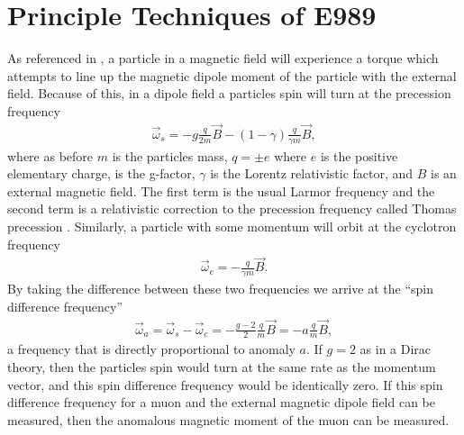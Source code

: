 
\thispagestyle{myheadings}

\graphicspath{{Body/Figures/ExperimentalOverview/Decay/}{Body/Figures/TrackingFigures/TrackerPics/}{Body/Figures/ExperimentalOverview/Ring/}{Body/Figures/ExperimentalOverview/Accelerator/}{Body/Figures/ExperimentalOverview/Beam/}{Body/Figures/ExperimentalOverview/Auxiliary/}{Body/Figures/MagneticField/}}

\chapter{Principle Techniques of E989}
\label{chapter:E989}

As referenced in , a particle in a magnetic field will experience a torque which attempts to line up the magnetic dipole moment of the particle with the external field. Because of this, in a dipole field a particles spin will turn at the precession frequency \cite{Jackson}
        \begin{align} \label{eq:ws}
            \vec{\omega}_{s} = -g\frac{q}{2m}\vec{B} - (1-\gamma)\frac{q}{\gamma m}\vec{B},
        \end{align}
where as before $m$ is the particles mass, $q = \pm e$ where $e$ is the positive elementary charge, \g is the g-factor, $\gamma$ is the Lorentz relativistic factor, and $B$ is an external magnetic field. The first term is the usual Larmor frequency and the second term is a relativistic correction to the precession frequency called Thomas precession \cite{Jackson}. Similarly, a particle with some momentum will orbit at the cyclotron frequency
        \begin{align} \label{eq:wc}
            \vec{\omega}_{c} = -\frac{q}{\gamma m}\vec{B}.
        \end{align}
By taking the difference between these two frequencies we arrive at the ``spin difference frequency''
        \begin{align} \label{eq:wasimple}
            \vec{\omega}_{a} = \vec{\omega}_{s} - \vec{\omega}_{c} = -\frac{g-2}{2}\frac{q}{m}\vec{B} = - a \frac{q}{m}\vec{B},
        \end{align}
a frequency that is directly proportional to anomaly $a$. If $g = 2$ as in a Dirac theory, then the particles spin would turn at the same rate as the momentum vector, and this spin difference frequency \wa would be identically zero. If this spin difference frequency for a muon and the external magnetic dipole field can be measured, then the anomalous magnetic moment of the muon \amu can be measured. 

